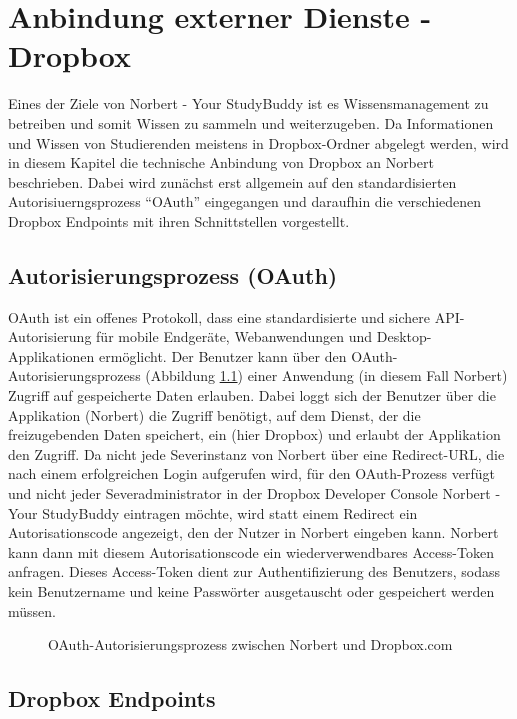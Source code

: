 

\chapter{Anbindung externer Dienste - Dropbox}

Eines der Ziele von Norbert - Your StudyBuddy ist es Wissensmanagement zu betreiben und somit Wissen zu sammeln und weiterzugeben. Da Informationen und Wissen von Studierenden meistens in Dropbox-Ordner abgelegt werden, wird in diesem Kapitel die technische Anbindung von Dropbox an Norbert beschrieben. Dabei wird zunächst erst allgemein auf den standardisierten Autorisiuerngsprozess \enquote{OAuth} eingegangen und daraufhin die verschiedenen Dropbox Endpoints mit ihren Schnittstellen vorgestellt.


\section{Autorisierungsprozess (OAuth)}

OAuth ist ein offenes Protokoll, dass eine standardisierte und sichere API-Autorisierung für mobile Endgeräte, Webanwendungen und Desktop-Applikationen ermöglicht. Der Benutzer kann über den OAuth-Autorisierungsprozess (Abbildung \ref{04ergebnis:oauth}) einer Anwendung (in diesem Fall Norbert) Zugriff auf gespeicherte Daten erlauben. Dabei loggt sich der Benutzer über die Applikation (Norbert) die Zugriff benötigt, auf dem Dienst, der die freizugebenden Daten speichert, ein (hier Dropbox) und erlaubt der Applikation den Zugriff. Da nicht jede Severinstanz von Norbert über eine Redirect-URL, die nach einem erfolgreichen Login aufgerufen wird, für den OAuth-Prozess verfügt und nicht jeder Severadministrator in der Dropbox Developer Console Norbert - Your StudyBuddy eintragen möchte, wird statt einem Redirect ein Autorisationscode angezeigt, den der Nutzer in Norbert eingeben kann. Norbert kann dann mit diesem Autorisationscode ein wiederverwendbares Access-Token anfragen. Dieses Access-Token dient zur Authentifizierung des Benutzers, sodass kein Benutzername und keine Passwörter ausgetauscht oder gespeichert werden müssen.

\begin{figure}[H]
\centering
	\scalebox{0.5}{}
	\caption{OAuth-Autorisierungsprozess zwischen Norbert und Dropbox.com}
	\label{04ergebnis:oauth}	
\end{figure}


\section{Dropbox Endpoints}

